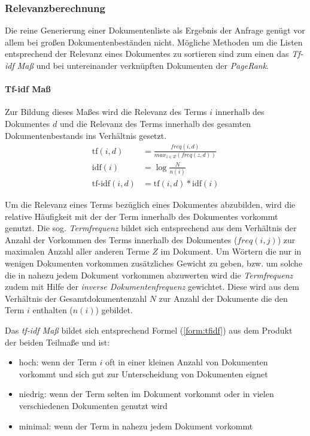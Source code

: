 \subsubsection{Relevanzberechnung}
Die reine Generierung einer Dokumentenliste als Ergebnis der Anfrage genügt vor allem bei großen Dokumentenbeständen nicht. Mögliche Methoden um die Listen  entsprechend der Relevanz eines Dokumentes zu sortieren sind zum einen das \textit{Tf-idf Maß} und bei untereinander verknüpften Dokumenten der \textit{PageRank}.

\paragraph{Tf-idf Maß} Zur Bildung dieses Maßes wird die Relevanz des Terms $i$ innerhalb des Dokumentes $d$ und die Relevanz des Terms innerhalb des gesamten Dokumentenbestands ins Verhältnis gesetzt.
\begin{align}
\text{tf}(i, d) & = \frac{freq(i, d)}{max_{z \in Z}(freq(z, d))} \\
\text{idf}(i) & = \log{\frac{N}{n(i)}} \\
\text{tf-idf}(i, d) & = \text{tf}(i ,d) \ast \text{idf}(i) \label{form:tfidf}
\end{align}

Um die Relevanz eines Terms bezüglich eines Dokumentes abzubilden, wird die relative Häufigkeit mit der der Term innerhalb des Dokumentes vorkommt genutzt. Die sog. \textit{Termfrequenz} bildet sich entsprechend aus dem Verhältnis der Anzahl der Vorkommen des Terms innerhalb des Dokumentes ($freq(i,j)$) zur maximalen Anzahl aller anderen Terme $Z$ im Dokument. Um Wörtern die nur in wenigen Dokumenten vorkommen zusätzliches Gewicht zu geben, bzw. um solche die in nahezu jedem Dokument vorkommen abzuwerten wird die \textit{Termfrequenz} zudem mit Hilfe der \textit{inverse Dokumentenfrequenz} gewichtet. Diese wird aus dem Verhältnis der Gesamtdokumentenzahl $N$ zur Anzahl der Dokumente die den Term $i$ enthalten ($n(i)$) gebildet.

Das \textit{tf-idf Maß} bildet sich entsprechend Formel (\ref{form:tfidf}) aus dem Produkt der beiden Teilmaße und ist:
\begin{itemize}
\item hoch: wenn der Term $i$ oft in einer kleinen Anzahl von Dokumenten vorkommt und sich gut zur Unterscheidung von Dokumenten eignet
\item niedrig: wenn der Term selten im Dokument vorkommt oder in vielen verschiedenen Dokumenten genutzt wird
\item minimal: wenn der Term in nahezu jedem Dokument vorkommt
\end{itemize}

